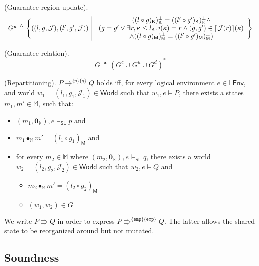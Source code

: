  (Guarantee region update).
\[
\begin{array}{r | l}
	G^u \triangleq \Bigg\{ ((l, g, \mathcal{J}), (l', g', \mathcal{J}))
	&
	\begin{array}{c}
		((l \circ g)_\mathsf{K})_\mathbb{K}^\bot = ((l' \circ g')_\mathsf{K})_\mathbb{K}^\bot \land \\
		(g = g' \lor \exists r, \kappa \leq l_\mathsf{K} \ldotp \imath(\kappa) = r \land (g, g') \in \lceil \mathcal{J}(r) \rceil(\kappa)  \\ \land ((l \circ g)_\mathsf{M})_\mathbb{M}^\bot = ((l' \circ g')_\mathsf{M})_\mathbb{M}^\bot )
	\end{array}
	\Bigg\}
\end{array}
\]

 (Guarantee relation).
\[
	G \triangleq (G^c \cup G^u \cup G^d)^*
\]

 (Repartitioning). $P \Rrightarrow^{\{p\}\{q\}} Q$ holds iff, for every logical environment $e \in \mathsf{LEnv}$, and world $w_1 = (l_1, g_1, \mathcal{J}_1) \in \mathsf{World}$ such that $w_1, e \vDash P$, there exists a states $m_1, m' \in \mathbb{M}$, such that:
\begin{itemize}
\item $(m_1, \mathbf{0}_\mathbb{K}), e \vDash_\mathsf{SL} p$ and
\item $m_1 \bullet_\mathbb{M} m' = (l_1 \circ g_1)_\mathsf{M}$ and
\item for every $m_2 \in \mathbb{M}$ where $(m_2, \mathbf{0}_\mathbb{K}), e \vDash_\mathsf{SL} q$, there exists a world $w_2 = (l_2, g_2, \mathcal{J}_2) \in \mathsf{World}$ such that $w_2, e \vDash Q$ and
	\begin{itemize}
		\item $m_2 \bullet_\mathbb{M} m' = (l_2 \circ g_2)_\mathsf{M}$
		\item $(w_1, w_2) \in G$
	\end{itemize}
\end{itemize}

We write $P \Rrightarrow Q$ in order to express $P \Rrightarrow^{\{\mathtt{emp}\}\{\mathtt{emp}\}}Q$. The latter allows the shared state to be reorganized around but not mutated.

\subsection{Soundness}

